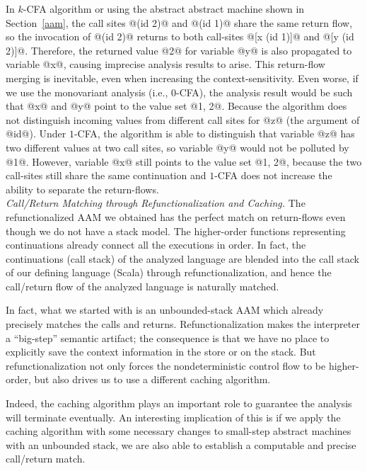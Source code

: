 \documentclass[acmsmall, review]{acmart}\settopmatter{}
\begin{document}
In $k$-CFA algorithm or using the abstract abstract machine shown in Section~\ref{aam},
the call sites @(id 2)@ and @(id 1)@ share the same return flow, so the invocation
of @(id 2)@ returns to both call-sites @[x (id 1)]@ and @[y (id 2)]@.  Therefore,
the returned value @2@ for variable @y@ is also propagated to variable @x@, causing
imprecise analysis results to arise. This return-flow merging is inevitable, even when
increasing the context-sensitivity. Even worse, if we use the monovariant analysis (i.e.,
$0$-CFA), the analysis result would be such that @x@ and @y@ point to the value set @{1, 2}@.
Because the algorithm does not distinguish incoming values from different call sites 
for @z@ (the argument of @id@). Under $1$-CFA, the algorithm is able to distinguish that variable
@z@ has two different values at two call sites, so variable @y@ would not be polluted by
@1@. However, variable @x@ still points to the value set @{1, 2}@, because the two call-sites 
still share the same continuation and $1$-CFA does not increase the ability to separate the 
return-flows. \\

\textit{Call/Return Matching through Refunctionalization and Caching.}
The refunctionalized AAM we obtained has the perfect match on return-flows even though
we do not have a stack model. The higher-order functions representing continuations
already connect all the executions in order. In fact, the continuations (call stack)
of the analyzed language are blended into the call stack of our defining language
(Scala) through refunctionalization, and hence the call/return flow of the analyzed 
language is naturally matched.

In fact, what we started with is an unbounded-stack AAM which already precisely
matches the calls and returns. Refunctionalization makes the interpreter a ``big-step''
semantic artifact; the consequence is that we have no place to explicitly save the context
information in the store or on the stack. 
But refunctionalization not only forces the nondeterministic control flow to be higher-order,
but also drives us to use a different caching algorithm.

Indeed, the caching algorithm plays an important role to guarantee the analysis will
terminate eventually.
An interesting implication of this is if we apply the caching algorithm with some 
necessary changes to small-step abstract machines with an unbounded stack, we are 
also able to establish a computable and precise call/return match.
\end{document}
